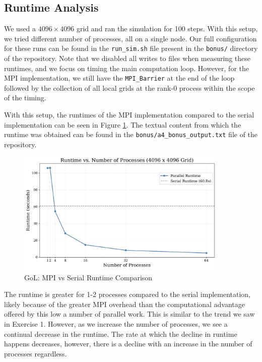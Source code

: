\documentclass[a4paper,10pt]{article}
\begin{document}
\subsection{Runtime Analysis}
We used a $4096 \times 4096$ grid and ran the simulation for 100 steps. With this setup, we tried different number of processes, all on a single node. Our full configuration for these runs can be found in the \verb|run_sim.sh| file present in the \verb|bonus/| directory of the repository. Note that we disabled all writes to files when measuring these runtimes, and we focus on timing the main computation loop. However, for the MPI implementation, we still have the \verb|MPI_Barrier| at the end of the loop followed by the collection of all local grids at the rank-0 process within the scope of the timing.

With this setup, the runtimes of the MPI implementation compared to the serial implementation can be seen in Figure \ref{fig:bonus_runtime}. The textual content from which the runtime was obtained can be found in the \verb|bonus/a4_bonus_output.txt| file of the repository.
\begin{figure}[H]
  \centering
  \includegraphics[width=0.9\textwidth]{img/bonus/runtime.png}
  \caption{GoL: MPI vs Serial Runtime Comparison}
  \label{fig:bonus_runtime}
\end{figure}

The runtime is greater for 1-2 processes compared to the serial implementation, likely because of the greater MPI overhead than the computational advantage offered by this low a number of parallel work. This is similar to the trend we saw in Exercise 1. However, as we increase the number of processes, we see a continual decrease in the runtime. The rate at which the decline in runtime happens decreases, however, there is a decline with an increase in the number of processes regardless. 
\end{document}
